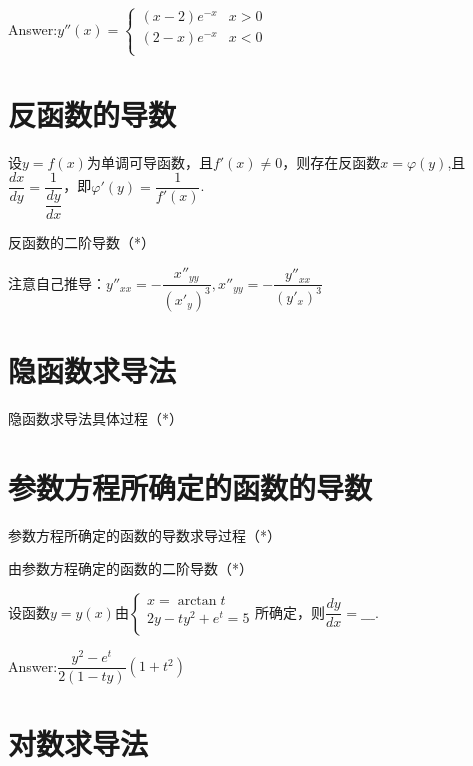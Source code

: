 \documentclass[12pt, a4paper, oneside]{ctexbook}
\begin{document}
Answer:$y''(x)=\begin{cases}
(x-2)e^{-x} & x > 0 \\
(2-x)e^{-x} & x < 0 \\
\end{cases}
$

\hspace*{\fill}


\section{反函数的导数}

设$y=f(x)$为单调可导函数，且$f'(x)\neq 0$，则存在反函数$x=\varphi (y)$,且$\dfrac{dx}{dy}=\dfrac{1}{\dfrac{dy}{dx}}$，即$\varphi '(y)=\dfrac{1}{f'(x)}$.

\hspace*{\fill}

反函数的二阶导数（*）

注意自己推导：$y''_{xx}=-\dfrac{x''_{yy}}{(x'_y)^3},x''_{yy}=-\dfrac{y''_{xx}}{(y'_{x})^3}$


\section{隐函数求导法}


隐函数求导法具体过程（*）


\section{参数方程所确定的函数的导数}

参数方程所确定的函数的导数求导过程（*）

\hspace*{\fill}

由参数方程确定的函数的二阶导数（*）

\hspace*{\fill}

设函数$y=y(x)$由$\begin{cases}
x = \arctan t \\
2y-ty^2+e^t=5 \\
\end{cases}
$所确定，则$\dfrac{dy}{dx}=\_\_\_.$

Answer:$\dfrac{y^2-e^t}{2(1-ty)}(1+t^2)$

\hspace*{\fill}


\section{对数求导法}
\end{document}
